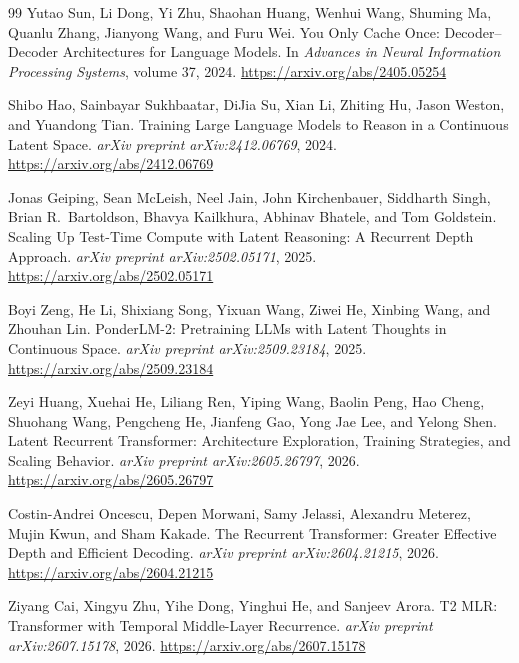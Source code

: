 \documentclass[11pt]{article}
\begin{document}
\begin{thebibliography}{99}
Yutao Sun, Li Dong, Yi Zhu, Shaohan Huang, Wenhui Wang, Shuming Ma,
Quanlu Zhang, Jianyong Wang, and Furu Wei.
\newblock You Only Cache Once: Decoder--Decoder Architectures for
Language Models.
\newblock In \textit{Advances in Neural Information Processing Systems},
volume 37, 2024.
\newblock \url{https://arxiv.org/abs/2405.05254}

Shibo Hao, Sainbayar Sukhbaatar, DiJia Su, Xian Li, Zhiting Hu,
Jason Weston, and Yuandong Tian.
\newblock Training Large Language Models to Reason in a Continuous
Latent Space.
\newblock \textit{arXiv preprint arXiv:2412.06769}, 2024.
\newblock \url{https://arxiv.org/abs/2412.06769}

Jonas Geiping, Sean McLeish, Neel Jain, John Kirchenbauer,
Siddharth Singh, Brian R.\ Bartoldson, Bhavya Kailkhura,
Abhinav Bhatele, and Tom Goldstein.
\newblock Scaling Up Test-Time Compute with Latent Reasoning:
A Recurrent Depth Approach.
\newblock \textit{arXiv preprint arXiv:2502.05171}, 2025.
\newblock \url{https://arxiv.org/abs/2502.05171}

Boyi Zeng, He Li, Shixiang Song, Yixuan Wang, Ziwei He,
Xinbing Wang, and Zhouhan Lin.
\newblock PonderLM-2: Pretraining LLMs with Latent Thoughts in
Continuous Space.
\newblock \textit{arXiv preprint arXiv:2509.23184}, 2025.
\newblock \url{https://arxiv.org/abs/2509.23184}

Zeyi Huang, Xuehai He, Liliang Ren, Yiping Wang, Baolin Peng,
Hao Cheng, Shuohang Wang, Pengcheng He, Jianfeng Gao,
Yong Jae Lee, and Yelong Shen.
\newblock Latent Recurrent Transformer: Architecture Exploration,
Training Strategies, and Scaling Behavior.
\newblock \textit{arXiv preprint arXiv:2605.26797}, 2026.
\newblock \url{https://arxiv.org/abs/2605.26797}

Costin-Andrei Oncescu, Depen Morwani, Samy Jelassi,
Alexandru Meterez, Mujin Kwun, and Sham Kakade.
\newblock The Recurrent Transformer: Greater Effective Depth and
Efficient Decoding.
\newblock \textit{arXiv preprint arXiv:2604.21215}, 2026.
\newblock \url{https://arxiv.org/abs/2604.21215}

Ziyang Cai, Xingyu Zhu, Yihe Dong, Yinghui He, and Sanjeev Arora.
\newblock T2 MLR: Transformer with Temporal Middle-Layer Recurrence.
\newblock \textit{arXiv preprint arXiv:2607.15178}, 2026.
\newblock \url{https://arxiv.org/abs/2607.15178}


\end{thebibliography}
\end{document}
